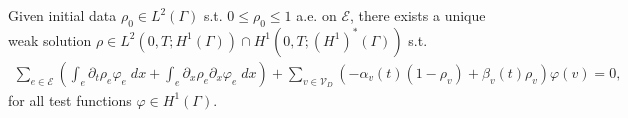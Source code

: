 \begin{theorem} 
    Given initial data $\rho_0 \in L^2(\Gamma)$ s.t. $0 \le \rho_0 \le 1$ a.e. on $\mathcal{E}$, there exists a unique weak solution $\rho \in L^2(0,T; H^1(\Gamma)) \cap H^1(0,T; (H^1)^*(\Gamma))$ s.t.
	\begin{align*}
		\sum_{e \in \mathcal{E}} \left(\int_e  \partial_t \rho_e \varphi_e \;dx + \int_e \partial_x \rho_e\partial_x \varphi_e \;dx\right) + \sum_{v \in \mathcal{V}_D} (-\alpha_v(t) (1-\rho_v) + \beta_v(t) \rho_v)\varphi(v) = 0,
	\end{align*}
	for all test functions $\varphi \in H^1(\Gamma)$.
\end{theorem}

